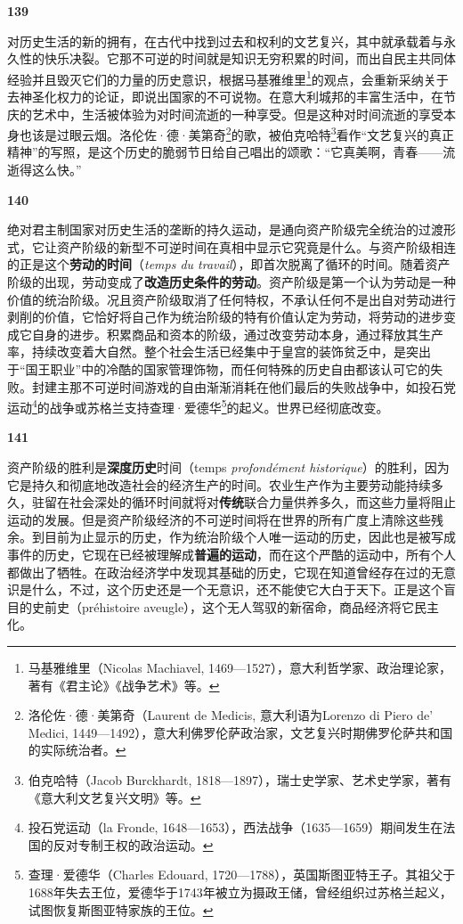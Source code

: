 \documentclass[fontset=fandol, a4paper, 12pt, openright]{ctexbook}
\makeatletter
\newcommand{\thesis}[1]{%
    \par\vspace{1.5em}%
    {\centering \textbf{\Large #1}\par}%
    \nobreak\vspace{0.5em}\nobreak
    \@afterindenttrue %
    \@afterheading    %
}
\makeatother
\begin{document}
\thesis{139}
对历史生活的新的拥有，在古代中找到过去和权利的文艺复兴，其中就承载着与永久性的快乐决裂。它那不可逆的时间就是知识无穷积累的时间，而出自民主共同体经验并且毁灭它们的力量的历史意识，根据马基雅维里\footnote{马基雅维里（Nicolas Machiavel, 1469—1527），意大利哲学家、政治理论家，著有《君主论》《战争艺术》等。}的观点，会重新采纳关于去神圣化权力的论证，即说出国家的不可说物。在意大利城邦的丰富生活中，在节庆的艺术中，生活被体验为对时间流逝的一种享受。但是这种对时间流逝的享受本身也该是过眼云烟。洛伦佐·德·美第奇\footnote{洛伦佐·德·美第奇（Laurent de Medicis, 意大利语为Lorenzo di Piero de' Medici, 1449—1492），意大利佛罗伦萨政治家，文艺复兴时期佛罗伦萨共和国的实际统治者。}的歌，被伯克哈特\footnote{伯克哈特（Jacob Burckhardt, 1818—1897），瑞士史学家、艺术史学家，著有《意大利文艺复兴文明》等。}看作“文艺复兴的真正精神”的写照，是这个历史的脆弱节日给自己唱出的颂歌：“它真美啊，青春——流逝得这么快。”

\thesis{140}
绝对君主制国家对历史生活的垄断的持久运动，是通向资产阶级完全统治的过渡形式，它让资产阶级的新型不可逆时间在真相中显示它究竟是什么。与资产阶级相连的正是这个\textbf{劳动的时间}（\textit{temps du travail}），即首次脱离了循环的时间。随着资产阶级的出现，劳动变成了\textbf{改造历史条件的劳动}。资产阶级是第一个认为劳动是一种价值的统治阶级。况且资产阶级取消了任何特权，不承认任何不是出自对劳动进行剥削的价值，它恰好将自己作为统治阶级的特有价值认定为劳动，将劳动的进步变成它自身的进步。积累商品和资本的阶级，通过改变劳动本身，通过释放其生产率，持续改变着大自然。整个社会生活已经集中于皇宫的装饰贫乏中，是突出于“国王职业”中的冷酷的国家管理饰物，而任何特殊的历史自由都该认可它的失败。封建主那不可逆时间游戏的自由渐渐消耗在他们最后的失败战争中，如投石党运动\footnote{投石党运动（la Fronde, 1648—1653），西法战争（1635—1659）期间发生在法国的反对专制王权的政治运动。}的战争或苏格兰支持查理·爱德华\footnote{查理·爱德华（Charles Edouard, 1720—1788），英国斯图亚特王子。其祖父于1688年失去王位，爱德华于1743年被立为摄政王储，曾经组织过苏格兰起义，试图恢复斯图亚特家族的王位。}的起义。世界已经彻底改变。

\thesis{141}
资产阶级的胜利是\textbf{深度历史}时间（temps \textit{profondément historique}）的胜利，因为它是持久和彻底地改造社会的经济生产的时间。农业生产作为主要劳动能持续多久，驻留在社会深处的循环时间就将对\textbf{传统}联合力量供养多久，而这些力量将阻止运动的发展。但是资产阶级经济的不可逆时间将在世界的所有广度上清除这些残余。到目前为止显示的历史，作为统治阶级个人唯一运动的历史，因此也是被写成事件的历史，它现在已经被理解成\textbf{普遍的运动}，而在这个严酷的运动中，所有个人都做出了牺牲。在政治经济学中发现其基础的历史，它现在知道曾经存在过的无意识是什么，不过，这个历史还是一个无意识，还不能使它大白于天下。正是这个盲目的史前史（préhistoire aveugle），这个无人驾驭的新宿命，商品经济将它民主化。
\end{document}
